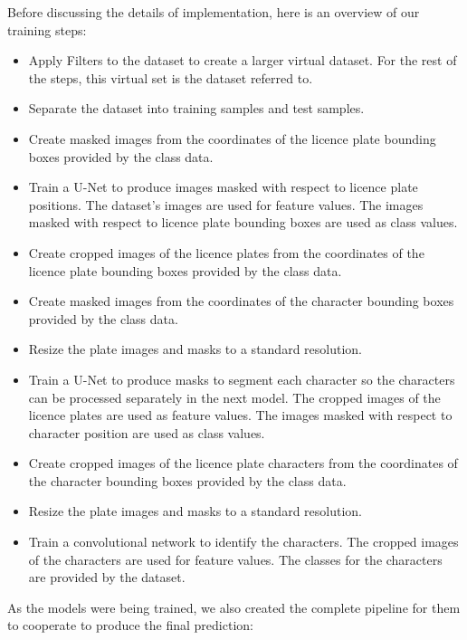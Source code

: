 \documentclass[conference]{IEEEtran}
\begin{document}
\par
Before discussing the details of implementation, here is an overview of our training steps: 

\begin{itemize}
\item Apply Filters to the dataset to create a larger virtual dataset. For the rest of the steps, this virtual set is the dataset referred to.
\item Separate the dataset into training samples and test samples.
\item Create masked images from the coordinates of the licence plate bounding boxes provided by the class data.
\item Train a U-Net to produce images masked with respect to licence plate positions. The dataset's images are used for feature values. The images masked with respect to licence plate bounding boxes are used as class values.
\item Create cropped images of the licence plates from the coordinates of the licence plate bounding boxes provided by the class data.
\item Create masked images from the coordinates of the character bounding boxes provided by the class data.
\item Resize the plate images and masks to a standard resolution.
\item Train a U-Net to produce masks to segment each character so the characters can be processed separately in the next model. The cropped images of the licence plates are used as feature values. The images masked with respect to character position are used as class values.
\item Create cropped images of the licence plate characters from the coordinates of the character bounding boxes provided by the class data.
\item Resize the plate images and masks to a standard resolution.
\item Train a convolutional network to identify the characters. The cropped images of the characters are used for feature values. The classes for the characters are provided by the dataset.
\end{itemize}

 \par
 As the models were being trained, we also created the complete pipeline for them to cooperate to produce the final prediction: 
 
\end{document}
